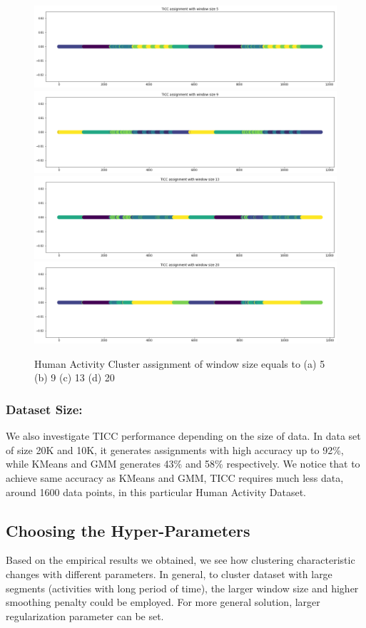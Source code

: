 \documentclass{llncs}
\begin{document}
\begin{figure}[H]
    \centering
    \includegraphics[width=.5\textwidth]{window5.png}\hfill
    \includegraphics[width=.5\textwidth]{window9.png}
    \includegraphics[width=.5\textwidth]{window13.png}\hfill
    \includegraphics[width=.5\textwidth]{window20.png}
    \caption{Human Activity Cluster assignment of window size equals to (a) 5 (b) 9 (c) 13 (d) 20}
    \label{fig:window}
\end{figure}

\subsubsection{Dataset Size:}We also investigate TICC performance depending on the size of data. In data set of size 20K and 10K, it generates assignments with high accuracy up to 92\%, while KMeans and GMM generates 43\% and 58\% respectively. We notice that to achieve same accuracy as KMeans and GMM, TICC requires much less data, around 1600 data points, in this particular Human Activity Dataset.

\subsection{Choosing the Hyper-Parameters}
Based on the empirical results we obtained, we see how clustering characteristic changes with different parameters. In general, to cluster dataset with large segments (activities with long period of time), the larger window size and higher smoothing penalty could be employed. For more general solution, larger regularization parameter can be set.
\end{document}
